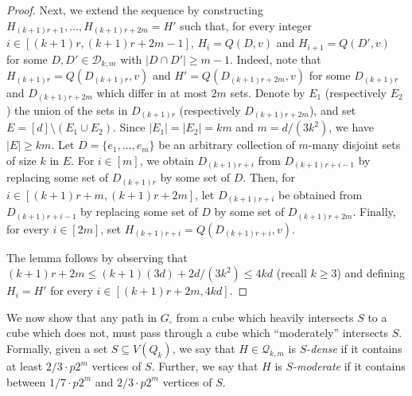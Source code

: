\documentclass{article}
\theoremstyle{definition}
\newcommand{\cD}{\mathcal{D}}
\newcommand{\cQ}{\mathcal{Q}}
\begin{document}
\begin{proof}
Next, we extend the sequence by constructing $H_{(k+1)r+1},\ldots,H_{(k+1)r+2m}=H'$ such that, for every integer $i\in [(k+1)r,(k+1)r+2m-1]$, $H_i=Q(D,v)$ and $H_{i+1}=Q(D',v)$ for some $D,D'\in\cD_{k,m}$ with $|D\cap D'|\ge m-1$. 
Indeed, note that $H_{(k+1)r}=Q(D_{(k+1)r},v)$ and $H'=Q(D_{(k+1)r+2m},v)$ for some $D_{(k+1)r}$ and $D_{(k+1)r+2m}$ which differ in at most $2m$ sets. 
Denote by $E_1$ (respectively $E_2$) the union of the sets in $D_{(k+1)r}$ (respectively $D_{(k+1)r+2m}$), and
set $E=[d]\setminus (E_1\cup E_2)$. Since $|E_1|=|E_2|=km$ and $m=d/(3k^2)$, we have $|E|\ge km$. 
Let $D=\{e_1,\ldots, e_m\}$ be an arbitrary collection of $m$-many disjoint sets of size $k$ in $E$. For $i\in [m]$, we obtain $D_{(k+1)r+i}$ from $D_{(k+1)r+i-1}$ by replacing some set of $D_{(k+1)r}$ by some set of $D$. Then, for $i\in [(k+1)r+m,(k+1)r+2m]$, let $D_{(k+1)r+i}$ be obtained from $D_{(k+1)r+i-1}$ by replacing some set of $D$ by some set of $D_{(k+1)r+2m}$. 
Finally, for every $i\in [2m]$, set $H_{(k+1)r+i}=Q(D_{(k+1)r+i},v)$. 

The lemma follows by observing that $(k+1)r+2m\leq (k+1)(3d)+2d/(3k^2)\leq 4kd$ (recall $k\ge 3$) and defining $H_i=H'$ for every $i\in [(k+1)r+2m,4kd]$.
\end{proof}

We now show that any path in $G_{\square}$ from a cube which heavily intersects $S$ to a cube which does not, must pass through a cube which ``moderately'' intersects $S$. Formally, given a set $S\subseteq V(Q_k)$, we say that $H\in\cQ_{k,m}$ is \textit{$S$-dense} if it contains at least $2/3\cdot p2^m$ vertices of $S$. Further, we say that $H$ is \textit{$S$-moderate} if it contains between $1/7\cdot p2^m$ and $2/3\cdot p2^m$ vertices of $S$.
\end{document}
